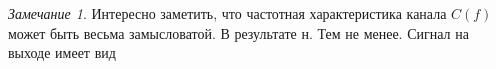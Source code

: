 \documentclass{book}
\numberwithin{theorem}{chapter}
\numberwithin{statement}{chapter}
\numberwithin{lemma}{chapter}
\theoremstyle{definition}
\numberwithin{task}{chapter}
\theoremstyle{remark}
\numberwithin{example}{chapter}
\theoremstyle{definition}
\numberwithin{definition}{chapter}
\theoremstyle{remark}
\newtheorem{note}{Замечание}
\theoremstyle{remark}
\numberwithin{lyrics}{section}
\begin{document}
%
%

\begin{note}
Интересно заметить, что частотная характеристика канала $C(f)$ может быть весьма замысловатой. В результате н. Тем не менее. Сигнал на выходе имеет вид
\end{note}
\end{document}
